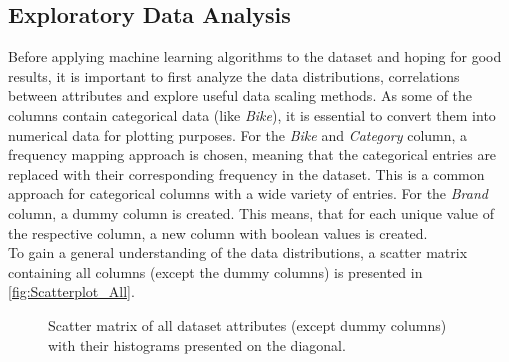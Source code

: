 \subsection{Exploratory Data Analysis}
\label{sec:Expl}
Before applying machine learning algorithms to the dataset and hoping for good results, it is important to first analyze 
the data distributions, correlations between attributes and explore useful data scaling methods.
As some of the columns contain categorical data (like \textit{Bike}), it is essential to convert them into numerical 
data for plotting purposes. For the \textit{Bike} and \textit{Category} column, a frequency mapping approach is chosen, meaning
that the categorical entries are replaced with their corresponding frequency in the dataset. This is a common approach for categorical columns
with a wide variety of entries. For the \textit{Brand} column, a dummy column is created. This means,
that for each unique value of the respective column, a new column with boolean values is created. \\
To gain a general understanding of the data distributions, a scatter matrix containing all columns (except the dummy columns) 
is presented in \autoref{fig:Scatterplot_All}.
\begin{figure}[h]
    \centering
        \caption{Scatter matrix of all dataset attributes (except dummy columns) with their histograms presented on the diagonal.}
        \label{fig:Scatterplot_All}
\end{figure}
